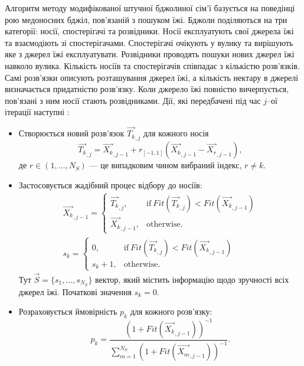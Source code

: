 Алгоритм методу модифікованої штучної бджолиної сім'ї базується на поведінці рою медоносних бджіл, пов'язаній з пошуком їжі.
Бджоли поділяються на три категорії: носії, спостерігачі та розвідники.
Носії експлуатують свої джерела їжі та взаємодіють зі спостерігачами.
Спостерігачі очікують у вулику та вирішують яке з джерел їжі експлуатувати.
Розвідники проводять пошуки нових джерел їжі навколо вулика.
Кількість носіїв та спостерігачів співпадає з кількістю розв'язків.
Самі розв'язки описують розташування джерел їжі, а кількість нектару в джерелі визначається придатністю розв'язку.
Коли джерело їжі повністю вичерпується, пов'язані з ним носії стають розвідниками.
Дії, які передбачені під час $j$--ої ітерації наступні \cite{MABC}:
\begin{itemize}
  \item Створюється новий розв'язок $\overrightarrow{T_{k}}_{,j}$ для кожного носія
 \begin{equation}
 \label{eqMABCNew}
 \overrightarrow{T_{k}}_{,j}=\overrightarrow{X_{k}}_{,j-1}+r_{[-1,1]}(\overrightarrow{X_{k}}_{,j-1}-\overrightarrow{X_{r}}_{,j-1}),
 \end{equation}
 де
 $r\in(1,\ldots,N_S)$ --- це випадковим чином вибраний індекс, $r\neq k$.
  \item Застосовується жадібний процес відбору до носіїв:
 \begin{eqnarray}
 \label{eqMABC_GS1}
 \overrightarrow{X_{k}}_{,j-1}=\left\{
 \begin{array}{ll}
\overrightarrow{T_{k}}_{,j},& \text{if} \: Fit(\overrightarrow{T_k}_{,j})<Fit(\overrightarrow{X_k}_{,j-1})\\
 \overrightarrow{X_{k}}_{,j-1},& \text{otherwise}.
 \end{array}
 \right.
 \\
 \label{eqMABC_GS2}
 s_k=\left\{
 \begin{array}{ll}
0,& \text{if} \: Fit(\overrightarrow{T_k}_{,j})<Fit(\overrightarrow{X_k}_{,j-1})\\
s_k+1 ,& \text{otherwise}.
 \end{array}
 \right.
 \end{eqnarray}
 Тут $\overrightarrow{S}=\{s_1,\ldots,s_{N_S}\}$ вектор, який містить інформацію щодо зручності всіх джерел їжі.
 Початкові значення $s_k=0$.

 \item Розраховується ймовірність $p_k$ для кожного розв'язку:
 \begin{equation}
 \label{eqMABCP}
 p_k=\frac{(1+ Fit(\overrightarrow{X_k}_{,j-1}))^{-1}}{\sum_{m=1}^{N_S}(1+ Fit(\overrightarrow{X_m}_{,j-1}))^{-1}}.
  \end{equation}


\end{itemize}
